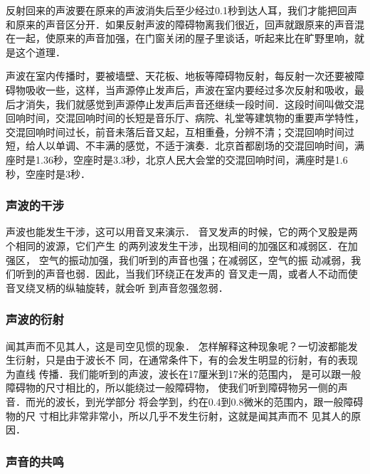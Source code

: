 反射回来的声波要在原来的声波消失后至少经过0.1秒到达人耳，我们才能把回声和原来的声音区分开．如果反射声波的障碍物离我们很近，回声就跟原来的声音混在一起，使原来的声音加强，在门窗关闭的屋子里谈话，听起来比在旷野里响，就是这个道理．

声波在室内传播时，要被墙壁、天花板、地板等障碍物反射，每反射一次还要被障碍物吸收一些，这样，当声源停止发声后，声波在室内要经过多次反射和吸收，最后才消失，我们就感觉到声源停止发声后声音还继续一段时间．这段时间叫做交混回响时间，交混回响时间的长短是音乐厅、病院、礼堂等建筑物的重要声学特性，交混回响时间过长，前音未落后音又起，互相重叠，分辨不清；交混回响时间过短，给人以单调、不丰满的感觉，不适于演奏．北京首都剧场的交混回响时间，满座时是1.36秒，空座时是3.3秒，北京人民大会堂的交混回响时间，满座时是1.6秒，空座时是3秒．

\subsubsection{声波的干涉}

声波也能发生干涉，这可以用音叉来演示．
音叉发声的时候，它的两个叉股是两个相同的波源，它们产生
的两列波发生干涉，出现相间的加强区和减弱区．在加强区，
空气的振动加强，我们听到的声音也强；在减弱区，空气的振
动减弱，我们听到的声音也弱．因此，当我们环绕正在发声的
音叉走一周，或者人不动而使音叉绕叉柄的纵轴旋转，就会听
到声音忽强忽弱．

\subsubsection{声波的衍射}

闻其声而不见其人，这是司空见惯的现象．
怎样解释这种现象呢？一切波都能发生衍射，只是由于波长不
同，在通常条件下，有的会发生明显的衍射，有的表现为直线
传播．我们能听到的声波，波长在17厘米到17米的范围内，
是可以跟一般障碍物的尺寸相比的，所以能绕过一般障碍物，
使我们听到障碍物另一侧的声音．而光的波长，到光学部分
将会学到，约在0.4到0.8微米的范围内，跟一般障碍物的尺
寸相比非常非常小，所以几乎不发生衍射，这就是闻其声而不
见其人的原因．


\subsubsection{声音的共鸣}


